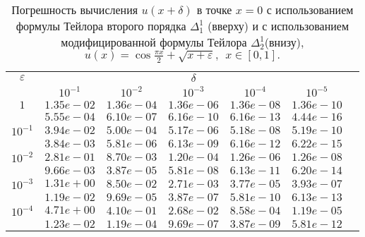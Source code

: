 \documentclass[10pt,twoside]{uz_kgu}
\begin{document}
\begin{table} [!htb]
		\caption {Погрешность вычисления $u(x+ \delta)$ в точке $x=0$ с использованием формулы Тейлора второго порядка $\Delta_1^1$ (вверху) и с использованием модифицированной формулы Тейлора $\Delta_2^1$(внизу), 
			$u(x)=  \cos \frac{\pi x}{2} + \sqrt{x+\varepsilon} ,\ \    x\in [0,1].$}
	\begin{center}
		\begin{tabular}{|c|c|c|c|c|c|c}
			\cline{1-6} $\varepsilon$ & \multicolumn{5}{c|}{$\delta$} \\
			\cline{2-6} &$10^{-1}$ & $10^{-2}$ & $10^{-3}$  & $10^{-4}$& $10^{-5}$\\
			\cline{1-6}
			$1$
			&$1.35e-02$&$1.36e-04$&$1.36e-06$&$1.36e-08$& $1.36e-10$\\
			&$5.55e-04$&$6.10e-07$&$6.16e-10$&$6.16e-13$& $4.44e-16$\\
			\cline{1-6}
			$10^{-1}$
			&$3.94e-02$&$5.00e-04$&$5.17e-06$&$5.18e-08$&$5.19e-10$\\
			&$3.84e-03$&$5.81e-06$&$6.13e-09$&$6.16e-12$&$6.22e-15$\\
			\cline{1-6}
			$10^{-2}$
			&$2.81e-01$&$8.70e-03$&$1.20e-04$&$1.26e-06$&$1.26e-08$\\
			&$9.66e-03$&$3.87e-05$&$5.81e-08$&$6.13e-11$&$6.20e-14$\\
			\cline{1-6}
			$10^{-3}$
			&$1.31e+00$&$8.50e-02$&$2.71e-03$&$3.77e-05$&$3.93e-07$\\
			&$1.19e-02$&$9.69e-05$&$3.87e-07$&$5.81e-10$&$6.13e-13$\\
			\cline{1-6}
			$10^{-4}$
			&$4.71e+00$&$4.10e-01$&$2.68e-02$&$8.58e-04$&$1.19e-05$\\
			&$1.23e-02$&$1.19e-04$&$9.69e-07$&$3.87e-09$&$5.81e-12$\\
			\cline{1-6}
		\end{tabular}
	\end{center}
\end{table}
\end{document}
